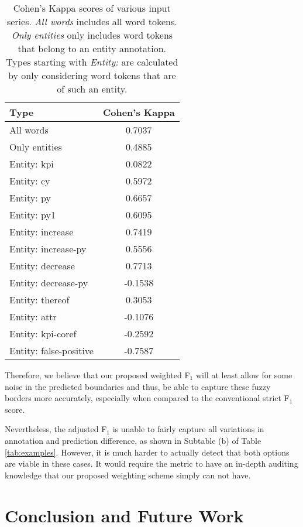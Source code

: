 \documentclass[conference, table]{IEEEtran}
\newcommand{\1} {\mathbbm{1}}
\begin{document}
\begin{table}[t]
\centering
\footnotesize
{}
\begin{tabular}{lc}
\toprule
\rowcolor{white}Type & Cohen's Kappa\\
\midrule
All words   & 0.7037 \\[3pt]

Only entities   & 0.4885 \\[3pt]

Entity: kpi   & 0.0822 \\
Entity: cy   & 0.5972 \\
Entity: py   & 0.6657 \\
Entity: py1   & 0.6095 \\
Entity: increase   & 0.7419 \\
Entity: increase-py   & 0.5556 \\
Entity: decrease   & 0.7713 \\
Entity: decrease-py   & -0.1538 \\
Entity: thereof   & 0.3053 \\
Entity: attr   & -0.1076 \\
Entity: kpi-coref   & -0.2592 \\
Entity: false-positive   & -0.7587 \\

\bottomrule
\end{tabular} \caption{Cohen's Kappa \cite{cohen1960coefficient} scores of various input series. \textit{All words} includes all word tokens. \textit{Only entities} only includes word tokens that belong to an entity annotation. Types starting with \textit{Entity:} are calculated by only considering word tokens that are of such an entity.}
\label{tab:kappa}
\end{table}
Therefore, we believe that our proposed weighted F$_1$ will at least allow for some noise in the predicted boundaries and thus, be able to capture these fuzzy borders more accurately, especially when compared to the conventional strict F$_1$ score.

Nevertheless, the adjusted F$_1$ is unable to fairly capture all variations in annotation and prediction difference, as shown in Subtable (b) of Table \ref{tab:examples}. However, it is much harder to actually detect that both options are viable in these cases. It would require the metric to have an in-depth auditing knowledge that our proposed weighting scheme simply can not have.

\section{Conclusion and Future Work}
\end{document}
